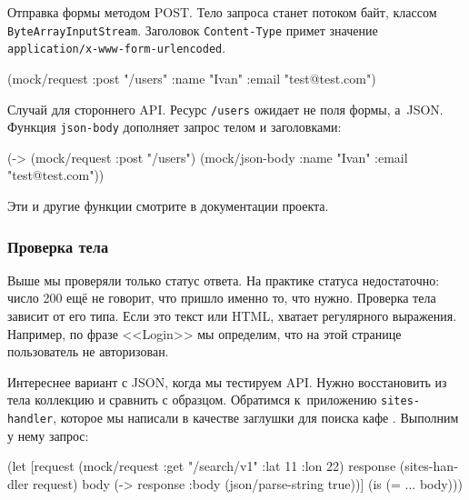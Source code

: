 \noindent
Отправка формы методом POST. Тело запроса станет потоком байт, классом
\verb|ByteArrayInputStream|. Заголовок \verb|Content-Type| примет значение
\verb|application/x-www-form-urlencoded|.

\begin{english}
  \begin{clojure}
(mock/request :post "/users"
              {:name "Ivan" :email "test@test.com"})
  \end{clojure}
\end{english}


\noindent
Случай для стороннего API. Ресурс \verb|/users| ожидает не поля формы, а~JSON.
Функция \verb|json-body| дополняет запрос телом и заголовками:

\begin{english}
  \begin{clojure}
(-> (mock/request :post "/users")
    (mock/json-body {:name "Ivan" :email "test@test.com"}))
  \end{clojure}
\end{english}

\noindent
Эти и другие функции смотрите в документации проекта.

\subsubsection*{Проверка тела}

Выше мы проверяли только статус ответа. На практике статуса недостаточно: число
200 ещё не говорит, что пришло именно то, что нужно. Проверка тела зависит от
его типа. Если это текст или HTML, хватает регулярного выражения. Например, по
фразе <<Login>> мы определим, что на этой странице пользователь не авторизован.


Интереснее вариант с JSON, когда мы тестируем API. Нужно восстановить из тела
коллекцию и сравнить с образцом. Обратимся к~приложению \verb|sites-handler|,
которое мы написали в качестве заглушки для поиска кафе .
Выполним у нему запрос:

\begin{english}
  \begin{clojure}
(let [request (mock/request :get "/search/v1"
                            {:lat 11 :lon 22})
      response (sites-handler request)
      body (-> response :body (json/parse-string true))]
  (is (= {...} body)))
  \end{clojure}
\end{english}

